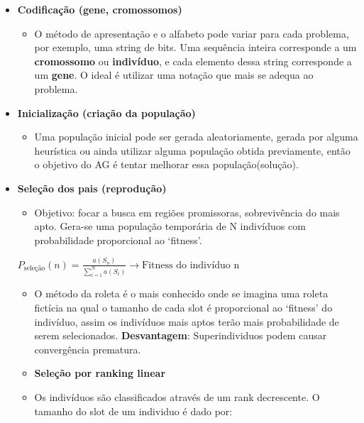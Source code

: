 \documentclass[12pt]{article}
\providecommand{\tightlist}{%
\setlength{\itemsep}{0pt}\setlength{\parskip}{0pt}}
\begin{document}
\begin{itemize}
\tightlist
\item
  \textbf{Codificação (gene, cromossomos)}

  \begin{itemize}
  \tightlist
  \item
    O método de apresentação e o alfabeto pode variar para cada
    problema, por exemplo, uma string de bits. Uma sequência inteira
    corresponde a um \textbf{cromossomo} ou \textbf{indivíduo}, e cada
    elemento dessa string corresponde a um \textbf{gene}. O ideal é
    utilizar uma notação que mais se adequa ao problema.
  \end{itemize}
\item
  \textbf{Inicialização (criação da população)}

  \begin{itemize}
  \tightlist
  \item
    Uma população inicial pode ser gerada aleatoriamente, gerada por
    alguma heurística ou ainda utilizar alguma população obtida
    previamente, então o objetivo do AG é tentar melhorar essa
    população(solução).
  \end{itemize}
\item
  \textbf{Seleção dos pais (reprodução)}

  \begin{itemize}
  \tightlist
  \item
    Objetivo: focar a busca em regiões promissoras, sobrevivência do
    mais apto. Gera-se uma população temporária de N indivíduos com
    probabilidade proporcional ao `fitness'.
  \end{itemize}

  \(P_{\text{seleção}}(n) = \frac{a(S_n)}{\sum_{i=1}^{N}a(S_i)} \rightarrow \text{Fitness do indivíduo n}\)

  \begin{itemize}
  \item
    O método da roleta é o mais conhecido onde se imagina uma roleta
    fictícia na qual o tamanho de cada slot é proporcional ao `fitness'
    do indivíduo, assim os indivíduos mais aptos terão mais
    probabilidade de serem selecionados. \textbf{Desvantagem}:
    Superindividuos podem causar convergência prematura.
  \item
    \textbf{Seleção por ranking linear}\\
  \item
    Os indivíduos são classificados através de um rank decrescente. O
    tamanho do slot de um individuo é dado por:
  \end{itemize}


\end{itemize}
\end{document}
